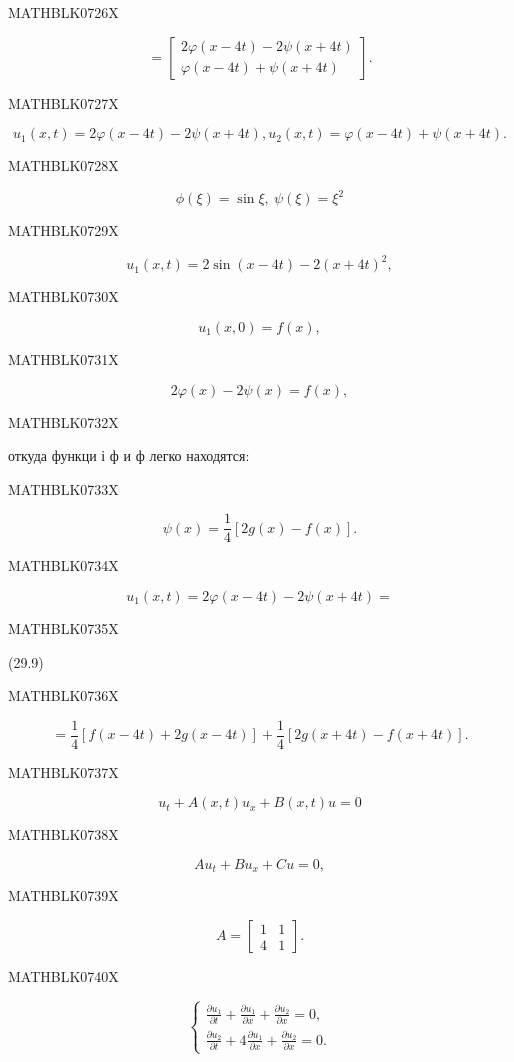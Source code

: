 \documentclass[
  ukrainian,
]{article}
\begin{document}
MATHBLK0726X

\[
= \begin{bmatrix} 2\varphi(x - 4t) - 2\psi(x + 4t) \\ \varphi(x - 4t) + \psi(x + 4t) \end{bmatrix}.
\]

MATHBLK0727X

\[
u_1(x, t) = 2\varphi(x-4t) - 2\psi(x+4t), u_2(x, t) = \varphi(x-4t) + \psi(x+4t).
\]

MATHBLK0728X

\[
\phi(\xi) = \sin \xi, \ \psi(\xi) = \xi^2
\]

MATHBLK0729X

\[
u_1(x, t) = 2 \sin(x-4t) - 2(x+4t)^2,
\]

MATHBLK0730X

\[
u_1(x, 0) = f(x),
\]

MATHBLK0731X

\[
2\varphi(x) - 2\psi(x) = f(x),
\]

MATHBLK0732X

откуда функци і ф и ф легко находятся:

MATHBLK0733X

\[
\psi(x) = \frac{1}{4} \left[ 2g(x) - f(x) \right].
\]

MATHBLK0734X

\[
u_{1}(x, t) = 2\varphi(x-4t) - 2\psi(x+4t) =
\]

MATHBLK0735X

(29.9)

MATHBLK0736X

\[
= \frac{1}{4} \left[ f(x-4t) + 2g(x-4t) \right] + \frac{1}{4} \left[ 2g(x+4t) - f(x+4t) \right].
\]

MATHBLK0737X

\[
u_t + A(x, t) u_x + B(x, t) u = 0
\]

MATHBLK0738X

\[
Au_t + Bu_x + Cu = 0,
\]

MATHBLK0739X

\[
A = \begin{bmatrix} 1 & 1 \\ 4 & 1 \end{bmatrix}.
\]

MATHBLK0740X

\[
\begin{cases} \frac{\partial u_1}{\partial t} + \frac{\partial u_1}{\partial x} + \frac{\partial u_2}{\partial x} = 0, \\ \frac{\partial u_2}{\partial t} + 4 \frac{\partial u_1}{\partial x} + \frac{\partial u_2}{\partial x} = 0. \end{cases}
\]
\end{document}
